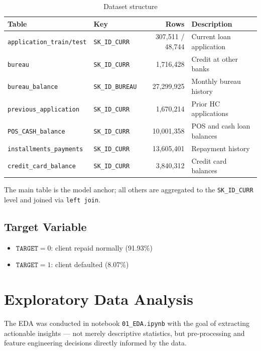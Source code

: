\documentclass[12pt, a4paper]{article}
\begin{document}
\begin{table}[H]
\centering
\begin{tabular}{llrl}
\toprule
\textbf{Table} & \textbf{Key} & \textbf{Rows} & \textbf{Description} \\
\midrule
\texttt{application\_train/test} & \texttt{SK\_ID\_CURR}   & 307,511 / 48,744 & Current loan application \\
\texttt{bureau}                  & \texttt{SK\_ID\_CURR}   & 1,716,428        & Credit at other banks \\
\texttt{bureau\_balance}         & \texttt{SK\_ID\_BUREAU} & 27,299,925       & Monthly bureau history \\
\texttt{previous\_application}   & \texttt{SK\_ID\_CURR}   & 1,670,214        & Prior HC applications \\
\texttt{POS\_CASH\_balance}      & \texttt{SK\_ID\_CURR}   & 10,001,358       & POS and cash loan balances \\
\texttt{installments\_payments}  & \texttt{SK\_ID\_CURR}   & 13,605,401       & Repayment history \\
\texttt{credit\_card\_balance}   & \texttt{SK\_ID\_CURR}   & 3,840,312        & Credit card balances \\
\bottomrule
\end{tabular}
\caption{Dataset structure}
\end{table}

The main table is the model anchor; all others are aggregated to the \texttt{SK\_ID\_CURR}
level and joined via \texttt{left join}.

\subsection{Target Variable}

\begin{itemize}
    \item $\texttt{TARGET} = 0$: client repaid normally (91.93\%)
    \item $\texttt{TARGET} = 1$: client defaulted (8.07\%)
\end{itemize}

\section{Exploratory Data Analysis}

The EDA was conducted in notebook \texttt{01\_EDA.ipynb} with the goal of extracting
actionable insights --- not merely descriptive statistics, but pre-processing and feature
engineering decisions directly informed by the data.
\end{document}
